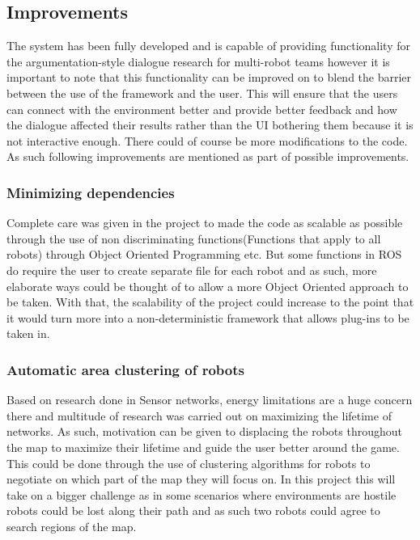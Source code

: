     \subsection{Improvements}
    The system has been fully developed and is capable of providing functionality for the argumentation-style dialogue research for multi-robot teams however it is important to note that this functionality can be improved on to blend the barrier between the use of the framework and the user. This will ensure that the users can connect with the environment better and provide better feedback and how the dialogue affected their results rather than the UI bothering them because it is not interactive enough. There could of course be more modifications to the code. As such following improvements are mentioned as part of possible improvements.

    \subsubsection{Minimizing dependencies}
      Complete care was given in the project to made the code as scalable as possible through the use of non discriminating functions(Functions that apply to all robots) through Object Oriented Programming etc. But some functions in ROS do require the user to create separate file for each robot and as such, more elaborate ways could be thought of to allow a more Object Oriented approach to be taken. With that, the scalability of the project could increase to the point that it would turn more into a non-deterministic framework that allows plug-ins to be taken in.

    \subsubsection{Automatic area clustering of robots}
      Based on research done in Sensor networks, energy limitations are a huge concern there and multitude of research was carried out on maximizing the lifetime of networks. As such, motivation can be given to displacing the robots throughout the map to maximize their lifetime and guide the user better around the game. This could be done through the use of clustering algorithms for robots to negotiate on which part of the map they will focus on. In this project this will take on a bigger challenge as in some scenarios where environments are hostile robots could be lost along their path and as such two robots could agree to search regions of the map.

